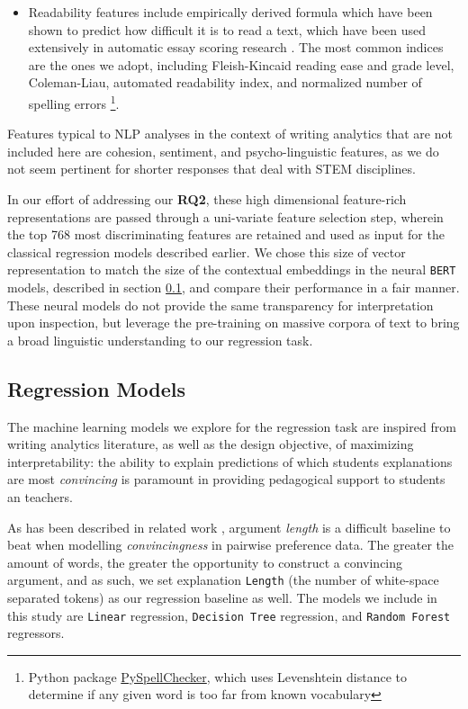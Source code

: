 \documentclass[notitlepage,12pt]{jedm}
\begin{document}
\begin{itemize}
	\item Readability features include empirically derived formula which have 
	been shown to predict how difficult it is to read a text, which have been 
	used extensively in automatic essay scoring research 
	\cite{graesser_coh-metrix:_2004}.
	The most common indices are the ones we adopt, including  
	Fleish-Kincaid reading ease and grade level,
	Coleman-Liau,
	automated readability index, and 
	normalized number of spelling errors 
	\footnote{Python package 
	\href{https://pypi.org/project/pyspellchecker/}{PySpellChecker}, 
	which uses Levenshtein distance to determine if any given word is too far 
	from known vocabulary}. 

	
\end{itemize}

Features typical to NLP analyses in the context of writing analytics that are 
not included here are cohesion, sentiment, and psycho-linguistic features, as 
we do not seem pertinent for shorter responses that deal with STEM disciplines.

In our effort of addressing our \textbf{RQ2}, these high dimensional 
feature-rich representations are passed through a uni-variate feature selection 
step, wherein the top 768 most discriminating features are retained and used as 
input for the classical regression models described earlier.  
We chose this size of vector representation to match the size of the contextual 
embeddings in the neural \verb|BERT| models, described in section 
\ref{sec:regress_models}, and compare their performance in a fair manner.
These neural models do not provide the same transparency for interpretation 
upon inspection, but leverage the pre-training on massive corpora of text to 
bring a broad linguistic understanding to our regression task.


\subsection{Regression Models}\label{sec:regress_models}

The machine learning models we explore for the regression task are
inspired from writing analytics literature, as well as the design objective, of 
maximizing interpretability: the ability to explain predictions of which 
students explanations are most \textit{convincing} is paramount in providing 
pedagogical support to students an teachers.

As has been described in related work \cite{habernal_which_2016}, argument 
\textit{length} is a difficult baseline to beat when modelling 
\textit{convincingness} in pairwise preference data.
The greater the amount of words, the greater the opportunity to construct a 
convincing argument, and as such, we set explanation \verb|Length| (the number 
of white-space separated tokens) as our regression baseline as well. 
The models we include in this study are \verb|Linear| regression, 
\verb|Decision Tree| regression, and \verb|Random Forest| regressors.
\end{document}
